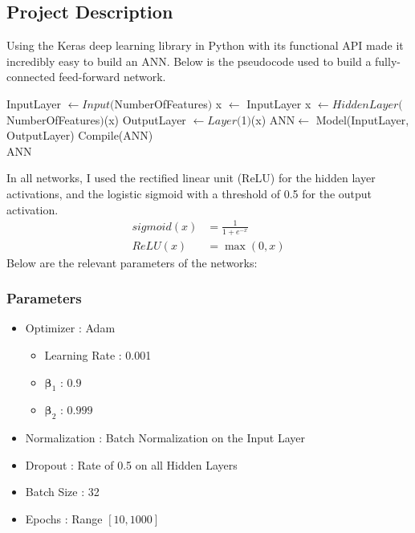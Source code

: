 \documentclass[letterpaper]{article}
\begin{document}
\subsection{Project Description} 
\par
Using the Keras %
deep learning library in Python with its functional API made it incredibly easy to build an ANN. Below is the pseudocode used to build a fully-connected
 feed-forward network.
\begin{algorithmic}[1]
\State InputLayer $\gets Input($NumberOfFeatures$)$
\State x $\gets$ InputLayer
        \State x $\gets HiddenLayer($NumberOfFeatures$)$(x)
\EndFor
\State OutputLayer $\gets Layer($1$)$(x)
\State ANN$\gets$ Model(InputLayer, OutputLayer)
\State Compile(ANN) \\
\Return ANN
\EndProcedure
\end{algorithmic}
\par
In all networks, I used the rectified linear unit (ReLU) for the hidden layer activations, and the logistic sigmoid with a threshold of 0.5
 for the output activation.
 \begin{align}
	sigmoid(x) &= \frac{1}{1 + e^{-x}} \\
	ReLU(x) &= \max(0, x)
\end{align}
Below are the relevant parameters of the networks: 
\subsubsection{Parameters}
\begin{itemize}
	\item
	Optimizer : Adam \cite{adam}
	\begin{itemize}
		\item
		Learning Rate : 0.001
		\item
		$\boldsymbol\beta_1$ : $0.9$
		\item
		$\boldsymbol\beta_2$ : $0.999$
	\end{itemize}
	\item
	Normalization : Batch Normalization on the Input Layer
	\item
	Dropout : Rate of 0.5 on all Hidden Layers
	\item
	Batch Size : 32
	\item
	Epochs : Range $[10, 1000]$
\end{itemize}

\printbibliography
\end{document}
